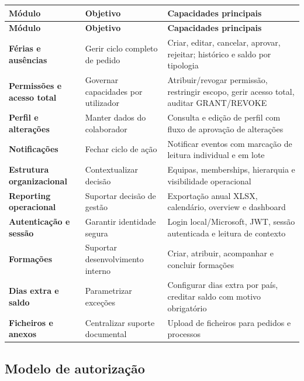 \documentclass[11pt,a4paper,twoside]{article}
\newcommand{\tH}[1]{\textbf{\sffamily\small\color{white}#1}}
\newcommand{\theadrow}{\rowcolor{ACCENT}}
\begin{document}
\begin{longtable}{>{\small\bfseries}p{3.5cm} >{\small}p{4.5cm} >{\small}p{5.4cm}}
\theadrow
\tH{Módulo} & \tH{Objetivo} & \tH{Capacidades principais} \\
\midrule
\endfirsthead
\theadrow
\tH{Módulo} & \tH{Objetivo} & \tH{Capacidades principais} \\
\midrule
\endhead
Férias e ausências & Gerir ciclo completo de pedido & Criar, editar, cancelar, aprovar, rejeitar; histórico e saldo por tipologia \\
Permissões e acesso total & Governar capacidades por utilizador & Atribuir/revogar permissão, restringir escopo, gerir acesso total, auditar GRANT/REVOKE \\
Perfil e alterações & Manter dados do colaborador & Consulta e edição de perfil com fluxo de aprovação de alterações \\
Notificações & Fechar ciclo de ação & Notificar eventos com marcação de leitura individual e em lote \\
Estrutura organizacional & Contextualizar decisão & Equipas, memberships, hierarquia e visibilidade operacional \\
Reporting operacional & Suportar decisão de gestão & Exportação anual XLSX, calendário, overview e dashboard \\
Autenticação e sessão & Garantir identidade segura & Login local/Microsoft, JWT, sessão autenticada e leitura de contexto \\
Formações & Suportar desenvolvimento interno & Criar, atribuir, acompanhar e concluir formações \\
Dias extra e saldo & Parametrizar exceções & Configurar dias extra por país, creditar saldo com motivo obrigatório \\
Ficheiros e anexos & Centralizar suporte documental & Upload de ficheiros para pedidos e processos \\
\bottomrule
\end{longtable}

\subsection{Modelo de autorização}
\end{document}
